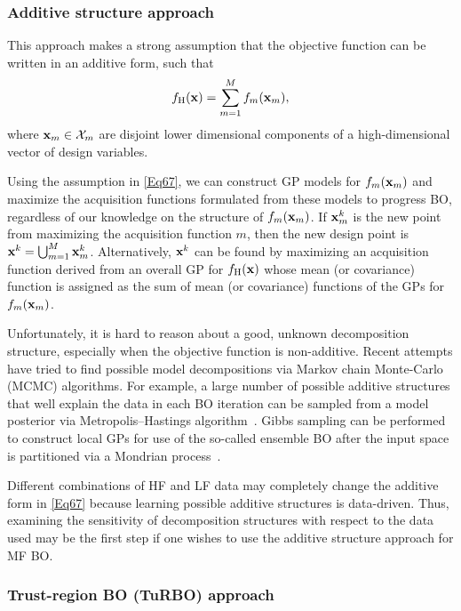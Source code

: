\documentclass[iicol,sn-basic]{sn-jnl}%
\begin{document}
\subsubsection{Additive structure approach}\label{Sec622}

This approach makes a strong assumption that the objective function can be written in an additive form, such that~\citep{Kandasamy2015}
\begin{equation}\label{Eq67}
	f_\text{H}({\bf x}) = \sum_{m=1}^{M}f_m({\bf x}_m), 
\end{equation}
where ${\bf x}_m \in \mathcal{X}_m$ are disjoint lower dimensional components of a high-dimensional vector of design variables.

Using the assumption in \cref{Eq67}, we can construct GP models for $f_m({\bf x}_m)$ and maximize the acquisition functions formulated from these models to progress BO, regardless of our knowledge on the structure of $f_m({\bf x}_m)$.
If ${\bf x}^k_m$ is the new point from maximizing the acquisition function $m$, then the new design point is ${\bf x}^k = \bigcup_{m=1}^M {\bf x}^k_m$.
Alternatively, ${\bf x}^k$ can be found by maximizing an acquisition function derived from an overall GP for $f_\text{H}({\bf x})$ whose mean (or covariance) function is assigned as the sum of mean (or covariance) functions of the GPs for $f_m({\bf x}_m)$. 

Unfortunately, it is hard to reason about a good, unknown decomposition structure, especially when the objective function is non-additive. 
Recent attempts have tried to find possible model decompositions via Markov chain Monte-Carlo (MCMC) algorithms.
For example, a large number of possible additive structures that well explain the data in each BO iteration can be sampled from a model posterior via Metropolis–Hastings algorithm~\citep{Gardner2017}. 
Gibbs sampling can be performed to construct local GPs for use of the so-called ensemble BO after the input space is partitioned via a Mondrian process~\citep{WangZ2018}.

Different combinations of HF and LF data may completely change the additive form in \cref{Eq67} because learning possible additive structures is data-driven.
Thus, examining the sensitivity of decomposition structures with respect to the data used may be the first step if one wishes to use the additive structure approach for MF BO.

\subsubsection{Trust-region BO (TuRBO) approach}\label{Sec623}
\end{document}
